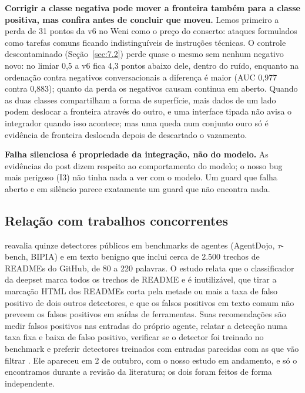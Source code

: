 \documentclass[11pt]{article}
\begin{document}
\textbf{Corrigir a classe negativa pode mover a fronteira também para a classe positiva, mas confira antes de concluir que moveu.} Lemos primeiro a perda de 31 pontos da v6 no Weni como o preço do conserto: ataques formulados como tarefas comuns ficando indistinguíveis de instruções técnicas. O controle descontaminado (Seção~\ref{sec:7.2}) perde quase o mesmo sem nenhum negativo novo: no limiar 0,5 a v6 fica 4,3 pontos abaixo dele, dentro do ruído, enquanto na ordenação contra negativos conversacionais a diferença é maior (AUC 0,977 contra 0,883); quanto da perda os negativos causam continua em aberto. Quando as duas classes compartilham a forma de superfície, mais dados de um lado podem deslocar a fronteira através do outro, e uma interface tipada não avisa o integrador quando isso acontece; mas uma queda num conjunto ouro só é evidência de fronteira deslocada depois de descartado o vazamento.

\textbf{Falha silenciosa é propriedade da integração, não do modelo.} As evidências do post dizem respeito ao comportamento do modelo; o nosso bug mais perigoso (I3) não tinha nada a ver com o modelo. Um guard que falha aberto e em silêncio parece exatamente um guard que não encontra nada.

\subsection{Relação com trabalhos concorrentes}\label{sec:9.3}

\citet{liu2026passing} reavalia quinze detectores públicos em benchmarks de agentes (AgentDojo, $\tau$-bench, BIPIA) e em texto benigno que inclui cerca de 2.500 trechos de READMEs do GitHub, de 80 a 220 palavras. O estudo relata que o classificador da deepset marca todos os trechos de README e é inutilizável, que tirar a marcação HTML dos READMEs corta pela metade ou mais a taxa de falso positivo de dois outros detectores, e que os falsos positivos em texto comum não preveem os falsos positivos em saídas de ferramentas. Suas recomendações são medir falsos positivos nas entradas do próprio agente, relatar a detecção numa taxa fixa e baixa de falso positivo, verificar se o detector foi treinado no benchmark e preferir detectores treinados com entradas parecidas com as que vão filtrar%
. Ele apareceu em 2 de outubro, com o nosso estudo em andamento, e só o encontramos durante a revisão da literatura; os dois foram feitos de forma independente.
\end{document}
